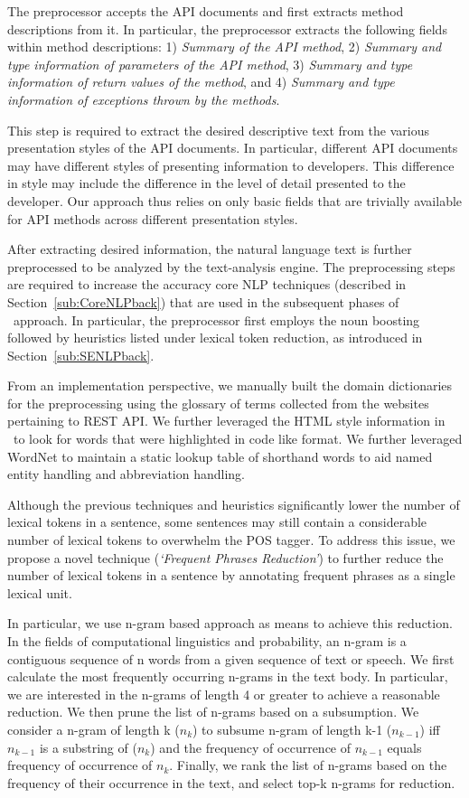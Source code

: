 The preprocessor accepts the API documents and first extracts method descriptions from it.
In particular, the preprocessor extracts the following fields within method descriptions: 
1) \textit{Summary of the API method},
2) \textit{Summary and type information of parameters of the API method}, 
3) \textit{Summary and type information of return values of the method}, and
4) \textit{Summary and type information of exceptions thrown by the methods}.

This step is required to extract the desired descriptive text from the various presentation styles of the API documents.
In particular, different API documents may have different styles of presenting information to developers.
This difference in style may include the difference in the level of detail presented to the developer.
Our approach thus relies on only basic fields that are trivially available for API methods across different presentation styles. 

After extracting desired information, the natural language text is further preprocessed to be analyzed by the text-analysis engine.
The preprocessing steps are required to increase the accuracy core NLP techniques (described in Section~\ref{sub:CoreNLPback}) that are used in the subsequent phases of \tool\ approach.
In particular, the preprocessor first employs the noun boosting followed by heuristics listed under lexical token reduction, as introduced in Section~\ref{sub:SENLPback}.



From an implementation perspective, we manually built the domain dictionaries for the preprocessing using the glossary of terms collected from the websites pertaining to REST API.
We further leveraged the HTML style information in \amazon\ to look for words that were highlighted in code like format. We further leveraged WordNet to maintain a static lookup table of shorthand words to aid named entity handling and abbreviation handling. 

Although the previous techniques and heuristics significantly lower the number of lexical tokens in a sentence, some sentences may still contain a considerable number of lexical tokens to overwhelm the POS tagger.
To address this issue, we propose a novel technique (\textit{`Frequent Phrases Reduction'}) to further reduce the number of lexical tokens in a sentence by annotating frequent phrases as a single lexical unit.

In particular, we use n-gram based approach as means to achieve this reduction. 
In the fields of computational linguistics and probability, an n-gram is a contiguous sequence of n words from a given sequence of text or speech. 
We first calculate the most frequently occurring n-grams in the text body. 
In particular, we are interested in the n-grams of length 4 or greater to achieve a reasonable reduction. 
We then prune the list of n-grams based on a subsumption. 
We consider a n-gram of length k ($n_k$) to subsume n-gram of length k-1 ($n_{k-1}$) iff $n_{k-1}$ is a substring of ($n_k$) and the frequency of occurrence of $n_{k-1}$ equals frequency of occurrence of $n_{k}$.
Finally, we rank the list of n-grams based on the frequency of their occurrence in the text, and select top-k n-grams for reduction.
 
